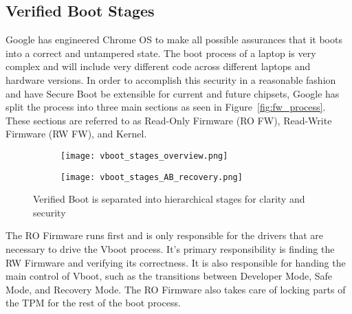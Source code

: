 \documentclass[../report.tex]{subfiles}
\begin{document}
%


\subsection{Verified Boot Stages}

Google has engineered Chrome OS to make all possible assurances that it boots into a correct and untampered state. 
The boot process of a laptop is very complex and will include very different code across different laptops and hardware versions. 
In order to accomplish this security in a reasonable fashion and have Secure Boot be extensible for current and future chipsets, Google has split the process into three main sections as seen in Figure~\ref{fig:fw_process}.
These sections are referred to as Read-Only Firmware (RO FW), Read-Write Firmware (RW FW), and Kernel.

\begin{figure}
\begin{subfigure}{.4\textwidth}
  \centering
  \texttt{[image: vboot\_stages\_overview.png]}
\end{subfigure}%
\begin{subfigure}{.60\textwidth}
  \centering
  \texttt{[image: vboot\_stages\_AB\_recovery.png]}
\end{subfigure}
\caption{Verified Boot is separated into hierarchical stages for clarity and security}
\label{fig:vboot_stages_overview}
\end{figure}


The RO Firmware runs first and is only responsible for the drivers that are necessary to drive the Vboot process. 
It's primary responsibility is finding the RW Firmware and verifying its correctness. 
It is also responsible for handing the main control of Vboot, such as the transitions between Developer Mode, Safe Mode, and Recovery Mode.
The RO Firmware also takes care of locking parts of the TPM for the rest of the boot process.
\end{document}
